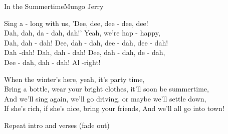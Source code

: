 \begin{song}{In the Summertime}{Mungo Jerry}
\begin{guitar}
Sing a - long with us, 'Dee, dee, dee - dee, dee!\\
Dah, dah, da - dah, dah!' Yeah, we're hap - happy,\\
Dah, dah - dah! Dee, dah - dah, dee - dah, dee - dah!\\
Dah -dah! Dah, dah - dah!    Dee, dah - dah, de - dah,\\
Dee - dah, dah - dah!  Al -right!\\
\end{guitar}



\begin{guitar}
When the winter's here, yeah, it's party time,\\
Bring a bottle, wear your bright clothes, it'll soon be summertime,\\
And we'll sing again, we'll go driving, or maybe we'll settle down,\\
If she's rich, if she's nice, bring your friends, And we'll all go into town!\\
\end{guitar}

\begin{guitar}
Repeat intro and verses (fade out) \\
\end{guitar}
\end{song}
